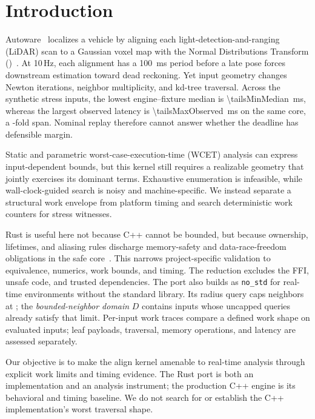 \section{Introduction}
\label{sec:intro}

Autoware~\cite{autoware} localizes a vehicle by aligning each light-detection-and-ranging (LiDAR) scan to a Gaussian
voxel map with the Normal Distributions Transform (\ndt)~\cite{biber2003ndt}. At 10\,Hz,
each alignment has a \SI{100}{ms} period before a late pose forces downstream estimation toward
dead reckoning. Yet input geometry changes Newton iterations, neighbor multiplicity, and
kd-tree traversal. Across the synthetic stress inputs, the lowest engine--fixture median is
\SI{\tailsMinMedian}{ms}, whereas the largest observed latency is
\SI{\tailsMaxObserved}{ms} on the same core, a \tailsLatencySpread-fold span. Nominal
replay therefore cannot answer whether the deadline has defensible margin.

Static and parametric worst-case-execution-time (WCET) analysis can express
input-dependent bounds, but this kernel
still requires a realizable geometry that jointly exercises its dominant terms. Exhaustive
enumeration is infeasible, while wall-clock-guided search is noisy and machine-specific. We
instead separate a structural work envelope from platform timing and search deterministic
work counters for stress witnesses.

Rust is useful here not because C++ cannot be bounded, but because ownership, lifetimes, and
aliasing rules discharge memory-safety and data-race-freedom obligations in the safe
core~\cite{jung2018rustbelt}. This narrows project-specific validation to equivalence,
numerics, work bounds, and timing. The reduction excludes the FFI, unsafe code, and trusted
dependencies. The port also builds as \texttt{no\_std} for real-time environments without
the standard library. Its radius query caps neighbors at \maxnn; the
\emph{bounded-neighbor domain} $D$ contains inputs whose uncapped queries already satisfy
that limit. Per-input work traces compare a defined work shape on evaluated inputs; leaf
payloads, traversal, memory operations, and latency are assessed separately.

Our objective is to make the \ndt{} align kernel amenable to real-time analysis through
explicit work limits and timing evidence. The Rust port is both an implementation and an
analysis instrument; the production C++ engine is its behavioral and timing baseline. We do
not search for or establish the C++ implementation's worst traversal shape.

